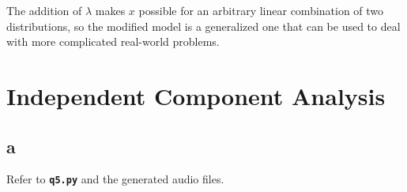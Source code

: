 \documentclass{article}
\begin{document}
The addition of $\lambda$ makes $x$ possible for an arbitrary linear combination of two distributions, so the modified model is a generalized one that can be used to deal with more complicated real-world problems.

\newpage

\section{Independent Component Analysis}

\subsection*{a}

Refer to \textbf{\texttt{q5.py}} and the generated audio files.
 
\end{document}
